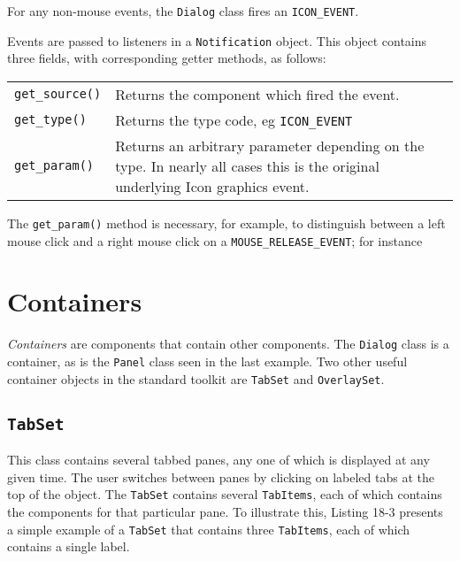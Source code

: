 \noindent For any non-mouse events, the \texttt{Dialog} class fires an
\texttt{ICON\_EVENT}.

Events are passed to listeners in a \texttt{Notification}
object. This object contains three fields,
with corresponding getter methods, as follows:

\vspace{0.15in}
\begin{xtabular}{m{1.2in} m{4.7in}}
\texttt{get\_source()} & Returns the component which fired the event.\\
\texttt{get\_type()} & Returns the type code, eg \texttt{ICON\_EVENT}\\
\texttt{get\_param()} &
Returns an arbitrary parameter depending on the type. In
nearly all cases this is the original underlying Icon graphics event.\\
\end{xtabular}
\vspace{0.15in}

The \texttt{get\_param()} method is necessary, for example, to
distinguish between a left mouse click and a right mouse click on a
\texttt{MOUSE\_RELEASE\_EVENT}; for instance


\section{Containers}

\textit{Containers} are components that contain other components.
The \texttt{Dialog} class is a container, as is
the \texttt{Panel} class seen in the last example.
Two other useful container objects in the standard toolkit are \texttt{TabSet}
and \texttt{OverlaySet}.

\subsection*{\texttt{TabSet}}

This class contains several tabbed panes, any one of which
is displayed at any given time. The user switches between panes by clicking on
labeled tabs at the top of the object. The \texttt{TabSet} contains several
\texttt{TabItems}, each of which contains the components for that particular
pane. To illustrate this, Listing 18-3 presents a simple example of a
\texttt{TabSet} that contains three \texttt{TabItems}, each of which contains a
single label.

